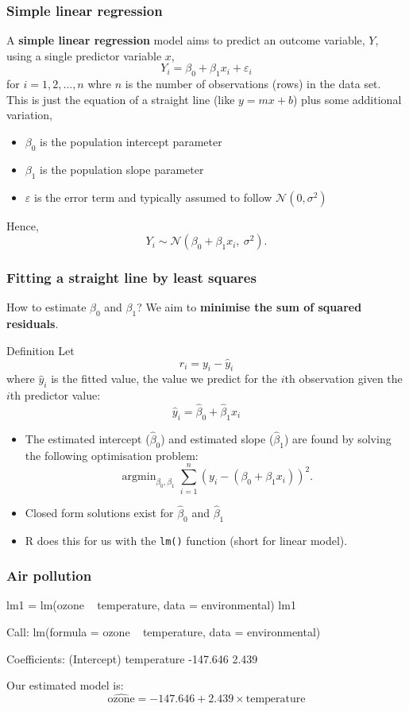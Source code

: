 \documentclass[a4paper]{article}
\DeclareMathOperator*{\argmin}{argmin}
\begin{document}
\subsubsection{Simple linear regression}
A \textbf{simple linear regression} model aims to predict an outcome variable, \( Y \), using a single predictor variable \( x \),
\[
	Y_i = \beta_0 + \beta_1 x_i + \varepsilon_i
\]
for \( i = 1,2,\dotsc,n \) whre \( n \) is the number of observations (rows) in the data set.\\
This is just the equation of a straight line (like \( y = mx + b \)) plus some additional variation,
\begin{itemize}
	\item \( \beta_0 \) is the population intercept parameter
	\item \( \beta_1 \) is the population slope parameter
	\item \( \varepsilon \) is the error term and typically assumed to follow \( \mathcal{N}(0,\sigma^2) \)
\end{itemize}
Hence,
\[
	Y_i \sim \mathcal{N}( \beta_0 + \beta_1 x_i,\ \sigma^2).
\]
\subsubsection{Fitting a straight line by least squares}
How to estimate \( \beta_0 \) and \( \beta_1 \)? We aim to \textbf{minimise the sum of squared residuals}.
\begin{bluebox}{Definition}
	Let
	\[
		r_i = y_i - \hat{y}_i
	\]
	where \( \hat{y}_i \) is the fitted value, the value we predict for the \( i \)th observation given the \( i \)th predictor value:
	\[
		\hat{y}_i = \hat{\beta}_0 + \hat{\beta}_1 x_i
	\]
\end{bluebox}
\begin{itemize}
	\item The estimated intercept (\( \hat{\beta}_0 \)) and estimated slope (\( \hat{\beta}_1 \)) are found by solving the following optimisation problem:
	\[
		\argmin_{\beta_0, \beta_1}\sum_{i=1}^n (y_i - (\beta_0 + \beta_1x_i))^2.
	\]
	\item Closed form solutions exist for \( \hat{\beta}_0 \) and \( \hat{\beta}_1 \)
	\item R does this for us with the \lstinline|lm()| function (short for linear model).
\end{itemize}
\subsubsection{Air pollution}
\begin{Schunk}
\begin{Sinput}
lm1 = lm(ozone ~ temperature, 
         data = environmental)
lm1
\end{Sinput}
\begin{Soutput}

Call:
lm(formula = ozone ~ temperature, data = environmental)

Coefficients:
(Intercept)  temperature  
   -147.646        2.439  
\end{Soutput}
\end{Schunk}
Our estimated model is:
\[
	\widehat{\text{ozone}} = -147.646 + 2.439\times \text{temperature}
\]
\end{document}
